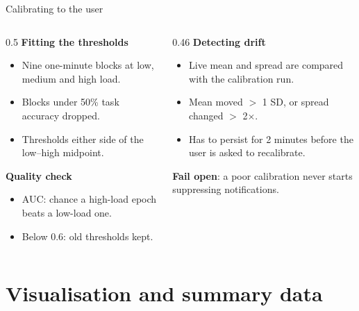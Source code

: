 \documentclass[aspectratio=169,11pt]{beamer}
\begin{document}
\begin{frame}{Calibrating to the user}
  \begin{columns}[T]
    \begin{column}{0.5\textwidth}
      \small
      \textbf{Fitting the thresholds}
      \begin{itemize}
        \item Nine one-minute blocks at low, medium and high load.
        \item Blocks under 50\% task accuracy dropped.
        \item Thresholds either side of the low--high midpoint.
      \end{itemize}

      \textbf{Quality check}
      \begin{itemize}
        \item AUC: chance a high-load epoch beats a low-load one.
        \item Below 0.6: old thresholds kept.
      \end{itemize}
    \end{column}

    \begin{column}{0.46\textwidth}
      \small
      \textbf{Detecting drift}
      \begin{itemize}
        \item Live mean and spread are compared with the calibration run.
        \item Mean moved $>$ 1 SD, or spread changed $>$ 2$\times$.
        \item Has to persist for 2 minutes before the user is asked to recalibrate.
      \end{itemize}

      \vspace{0.2cm}
      \textbf{Fail open}: a poor calibration never starts suppressing notifications.
    \end{column}
  \end{columns}

\end{frame}


\section{Visualisation and summary data}
\end{document}

